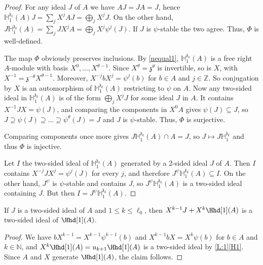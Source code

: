 \documentclass[a4paper,11pt]{amsart}
\numberwithin{equation}{subsection}
\theoremstyle{definition}
\theoremstyle{theorem}
\theoremstyle{remark}
\newcommand\kapp{{\mathfrak{z}}}
\newcommand\HH{\mathbb{H}}
\newcommand\N{\mathbb{N}}
\newcommand\Z{\mathbb{Z}}
\begin{document}
\begin{proof}
For any ideal $J$ of $A$ we have $AJ=JA=J$, hence
  $\HH^{\kapp_k}_1(A) J=\sum_jX^{j}AJ=\bigoplus_jX^{j}J$.
  On the other hand,   $J\HH^{\kapp_k}_1(A)=\sum_jJX^{j}A=\bigoplus_jX^{j}\psi^{j}(J)$.
  If $J$ is $\psi$-stable the two agree. Thus, $\Phi$ is well-defined.

The map $\Phi$ obviously preserves inclusions. By \autoref{nequal1}, $\HH^{\kapp_k}_1(A)$ is a free  right
  $A$-module with basis $X^{0},\dots,X^{\theta-1}$.  Since $X^{\theta}=\kapp^{\theta}$ is
  invertible, so is $X$, with $X^{-1}=\kapp^{-\theta}X^{\theta-1}$. Moreover,
   $X^{-j}bX^{j}=\psi^{j}(b)$ for $b\in A$ and
  $j\in\Z$. So conjugation by $X$ is an automorphism of $\HH^{\kapp_k}_1(A)$ restricting
  to $\psi$ on $A$.  Now  any two-sided ideal in $\HH^{\kapp_k}_1(A)$ is of the form
  $\bigoplus_jX^{j}J$ for some ideal $J$ in $A$. It contains $X^{-1}JX=\psi(J)$, and
  comparing the components in $X^{0}A$ gives $\psi(J)\subseteq J$, so
  $J\supseteq\psi(J)\supseteq\dots\supseteq\psi^{\theta}(J)=J$ and $J$ is
  $\psi$-stable. Thus, $\Phi$ is surjective.

  Comparing components once more gives $J\HH^{\kapp_k}_1(A)\cap A=J$, so
  $J\mapsto J\HH^{\kapp_k}_1$ and thus $\Phi$ is injective.

  Let  $I$ the two-sided ideal of $\HH^{\kapp_k}_1(A)$ generated by a 2-sided ideal
  $J$ of $A$. Then $I$ contains $X^{-j}JX^{j}=\psi^{j}(J)$ for every $j$, and therefore  $J^{\psi}\HH^{\kapp_k}_1(A)\subseteq I$. On the other hand,  $J^{\psi}$ is $\psi$-stable and
  contains $J$, so $J^{\psi}\HH^{\kapp_k}_1(A)$ is a two-sided ideal containing $J$. But then $I=J^{\psi}\HH^{\kapp_k}_1(A)$.
  \end{proof}

\begin{Lemma}\label{L:nilp}
  If $J$ is a two-sided ideal of $A$ and $1\le k\le\ell_0$, then
  $X^{k-1}J+X^{k}\Hhd[1](A)$ is a two-sided ideal of $\Hhd[1](A)$.
\end{Lemma}

\begin{proof}
We have  $b X^{k-1}=X^{k-1}\psi^{k-1}(b)$ and
  $X^{k-1}bX=X^{k}\psi(b)$ for $b\in A$ and $k\in\N$, and
  $X^{k}\Hhd[1](A)=u_{k+1}\Hhd[1](A)$ is a two-sided ideal by
  \autoref{L:1}\autoref{H1}. Since $A$ and $X$ generate $\Hhd[1](A)$, the
  claim follows.
\end{proof}
\end{document}
